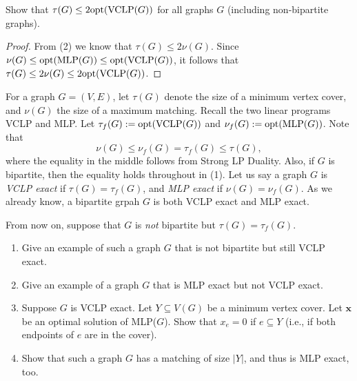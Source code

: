     \bigskip

    \begin{thm}{}{}
        Show that $\tau(G) \leq 2{\rm opt}({\rm VCLP}(G))$ for all graphs $G$ (including non-bipartite graphs).
    \end{thm}

    \begin{proof}
        From (2) we know that $\tau(G) \leq 2\nu(G)$. Since $\nu(G) \leq {\rm opt}({\rm MLP}(G)) \leq {\rm opt}({\rm VCLP}(G))$, it follows that $\tau(G) \leq 2\nu(G) \leq 2{\rm opt}({\rm VCLP}(G))$.
    \end{proof}

    \newpage
    
    \begin{thm}{}{}
        For a graph $G = (V, E)$, let $\tau(G)$ denote the size of a minimum vertex cover, and $\nu(G)$ the size of a maximum matching. Recall the two linear programs VCLP and MLP. Let $\tau_f(G) := {\rm opt}({\rm VCLP}(G))$ and $\nu_f(G) := {\rm opt}({\rm MLP}(G))$. Note that
        $$
        \nu(G) \leq \nu_f(G) = \tau_f(G) \leq \tau(G),
        $$
        where the equality in the middle follows from Strong LP Duality. Also, if $G$ is bipartite, then the equality holds throughout in (1). Let us say a graph $G$ is {\it VCLP exact} if $\tau(G) = \tau_f(G)$, and {\it MLP exact} if $\nu(G) = \nu_f(G)$. As we already know, a bipartite grpah $G$ is both VCLP exact and MLP exact.
        
        From now on, suppose that $G$ is {\it not} bipartite but $\tau(G) = \tau_f(G)$.
        
        \begin{enumerate}
            \item Give an example of such a graph $G$ that is not bipartite but still VCLP exact.
            \item Give an example of a graph $G$ that is MLP exact but not VCLP exact.
            \item Suppose $G$ is VCLP exact. Let $Y \subseteq V(G)$ be a minimum vertex cover. Let $\mathbf{x}$ be an optimal solution of MLP($G$). Show that $x_e = 0$ if $e \subseteq Y$ (i.e., if both endpoints of $e$ are in the cover).
            \item Show that such a graph $G$ has a matching of size $|Y|$, and thus is MLP exact, too.
        \end{enumerate}
    \end{thm}

